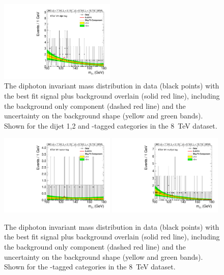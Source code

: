 \begin{figure}
  \includegraphics[width=0.49\textwidth]{results/plots/mgg-cats/mgg_mva_nosub_ch2_cat13_8TeV.pdf}
  \caption[The diphoton invariant mass distribution in data with the best fit signal plus background overlain for the dijet 1,2 and \acs{VH}-tagged categories in the 8~TeV dataset.]{The diphoton invariant mass distribution in data (black points) with the best fit signal plus background overlain (solid red line), including the background only component (dashed red line) and the uncertainty on the background shape (yellow and green bands). Shown for the dijet 1,2 and \VH-tagged categories in the 8~TeV dataset.}
  \label{fig:bfres4}
\end{figure}

\begin{figure}
  \vspace{-1cm}
  \includegraphics[width=0.49\textwidth]{results/plots/mgg-cats/mgg_mva_nosub_ch2_cat11_8TeV.pdf}
  \includegraphics[width=0.49\textwidth]{results/plots/mgg-cats/mgg_mva_nosub_ch2_cat12_8TeV.pdf}
  \caption[The diphoton invariant mass distribution in data with the best fit signal plus background overlain for the \acs{ttH}-tagged categories in the 8~TeV dataset.]{The diphoton invariant mass distribution in data (black points) with the best fit signal plus background overlain (solid red line), including the background only component (dashed red line) and the uncertainty on the background shape (yellow and green bands). Shown for the \ttH-tagged categories in the 8~TeV dataset.}
  \label{fig:bfres5}
\end{figure}

